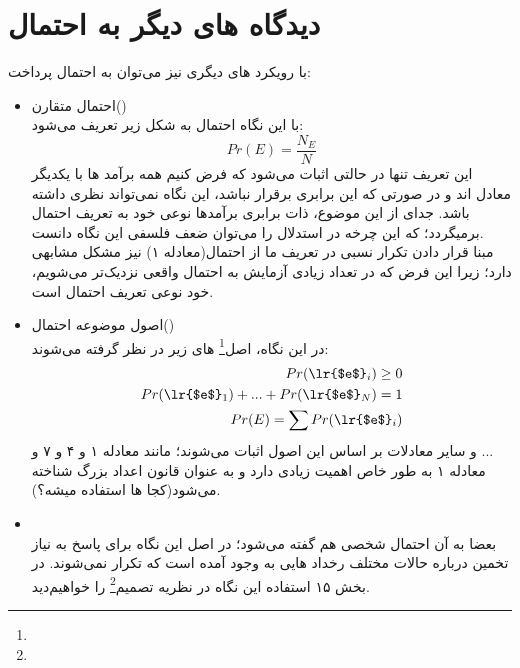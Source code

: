 \documentclass[12pt,onecolumn,a4paper]{article}
\begin{document}
\section{دیدگاه های دیگر به احتمال}
با رویکرد های دیگری نیز می‌توان به احتمال پرداخت:
\begin{itemize}
    \item احتمال متقارن() \\
        با این نگاه احتمال به شکل زیر تعریف می‌شود:
        \begin{equation}
            Pr(E) = \dfrac{N_E}{N}
        \end{equation}
        این تعریف تنها در حالتی اثبات می‌شود که فرض کنیم همه برآمد ها با یکدیگر معادل اند و در صورتی که این برابری برقرار نباشد، این نگاه نمی‌تواند نظری داشته باشد. جدای از این موضوع، ذات برابری برآمدها نوعی خود به تعریف احتمال برمیگردد؛ که این چرخه در استدلال را می‌توان ضعف فلسفی این نگاه دانست. \\
        مبنا قرار دادن تکرار نسبی در تعریف ما از احتمال(معادله ۱) نیز مشکل مشابهی دارد؛ زیرا این فرض که در تعداد زیادی آزمایش به احتمال واقعی نزدیک‌تر می‌شویم، خود نوعی تعریف احتمال است.
    \item اصول موضوعه احتمال() \\
        در این نگاه، اصل\footnote{} های زیر در نظر گرفته می‌شوند:
        \begin{align*}
            Pr(\text{\lr{$e$}}_i) \geq 0 \\
            Pr(\text{\lr{$e$}}_1) + ... + Pr(\text{\lr{$e$}}_N) = 1 \\
            Pr(E) = \sum Pr(\text{\lr{$e$}}_i)
        \end{align*}
        و سایر معادلات بر اساس این اصول اثبات می‌شوند؛ مانند معادله ۱ و ۴ و ۷ و ... \\
        معادله ۱ به طور خاص اهمیت زیادی دارد و به عنوان قانون اعداد بزرگ شناخته می‌شود(کجا ها استفاده میشه؟).
    \item {} \\ 
        بعضا به آن احتمال شخصی هم گفته می‌شود؛ در اصل این نگاه برای پاسخ به نیاز تخمین درباره حالات مختلف رخداد هایی به وجود آمده است که تکرار نمی‌شوند. در بخش ۱۵ استفاده این نگاه در نظریه تصمیم\footnote{} را خواهیم‌دید.
\end{itemize}
\end{document}

